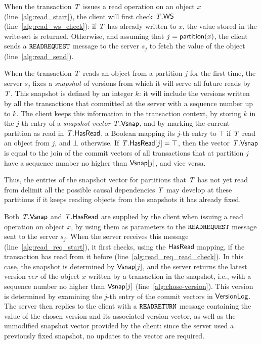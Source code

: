 When the transaction $\mathit{T}$ issues a read operation on an object $x$ (line~\ref{alg:read_start}), the client will first check $\mathit{T}.\mathsf{WS}$ (line~\ref{alg:read_ws_check}): if $\mathit{T}$ has already written to $x$, the value stored in the write-set is returned. Otherwise, and assuming that $j = \mathsf{partition}(x)$, the client sends a ${\tt READREQUEST}$ message to the server $s_j$ to fetch the value of the object (line~\ref{alg:read_send}).

When the transaction $\mathit{T}$ reads an object from a partition $j$ for the first time, the server $s_j$ fixes a \emph{snapshot} of versions from which it will serve all future reads by $\mathit{T}$. This snapshot is defined by an integer $k$: it will include the versions written by all the transactions that committed at the server with a sequence number up to $k$. The client keeps this information in the transaction context, by storing $k$ in the $j$-th entry of a \emph{snapshot vector} $\mathit{T}.\mathsf{Vsnap}$, and by marking the current partition as read in $\mathit{T}.\mathsf{HasRead}$, a Boolean mapping its $j$-th entry to $\top$ if $\mathit{T}$ read an object from $j$, and $\bot$ otherwise. If $\mathit{T}.\mathsf{HasRead}[j]=\top$, then the vector $\mathit{T}.\mathsf{Vsnap}$ is equal to the join of the commit vectors of all transactions that at partition $j$ have a sequence number no higher than $\mathsf{Vsnap}[j]$, and vice versa.

 Thus, the entries of the snapshot vector for partitions that $\mathit{T}$ has not yet read from delimit all the possible causal dependencies $\mathit{T}$ may develop at these partitions if it keeps reading objects from the snapshots it has already fixed.

Both $\mathit{T}.\mathsf{Vsnap}$ and $\mathit{T}.\mathsf{HasRead}$ are supplied by the client when issuing a read operation on object $x$, by using them as parameters to the ${\tt READREQUEST}$ message sent to the server $s_j$. When the server receives this message (line~\ref{alg:read_req_start}), it first checks, using the $\mathsf{HasRead}$ mapping, if the transaction has read from it before (line~\ref{alg:read_req_read_check}). In this case, the snapshot is determined by $\mathsf{Vsnap}[j]$, and the server returns the latest version $\mathit{ver}$ of the object $x$ written by a transaction in the snapshot, i.e., with a sequence number no higher than $\mathsf{Vsnap}[j]$ (line~\ref{alg:chose-version}). This version is determined by examining the $j$-th entry of the commit vectors in $\mathsf{VersionLog}$. The server then replies to the client with a ${\tt READRETURN}$ message containing the value of the chosen version and its associated version vector, as well as the unmodified snapshot vector provided by the client: since the server used a previously fixed snapshot, no updates to the vector are required.

